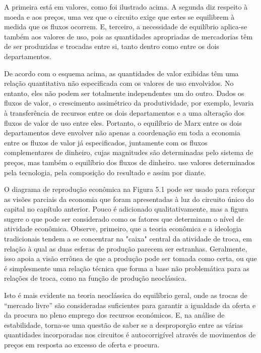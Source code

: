 A primeira está em valores, como foi ilustrado acima. A segunda diz respeito à moeda e aos preços, uma vez que o circuito exige que estes se equilibrem à medida que os fluxos ocorrem. E, terceiro, a necessidade de equilíbrio aplica-se também aos valores de uso, pois as quantidades apropriadas de mercadorias têm de ser produzidas e trocadas entre si, tanto dentro como entre os dois departamentos.
 \par 
De acordo com o esquema acima, as quantidades de valor exibidas têm uma relação quantitativa não especificada com os valores de uso envolvidos. No entanto, eles não podem ser totalmente independentes um do outro. Dados os fluxos de valor, o crescimento assimétrico da produtividade, por exemplo, levaria à transferência de recursos entre os dois departamentos e a uma alteração dos fluxos de valor de uso entre eles. Portanto, o equilíbrio de Marx entre os dois departamentos deve envolver não apenas a coordenação em toda a economia entre os fluxos de valor já especificados, juntamente com os fluxos complementares de dinheiro, cujas magnitudes são determinadas pelo sistema de preços, mas também o equilíbrio dos fluxos de dinheiro. use valores determinados pela tecnologia, pela composição do resultado e assim por diante.
 \par 
O diagrama de reprodução econômica na Figura {\color{blue}5}.1 pode ser usado para reforçar as visões parciais da economia que foram apresentadas à luz do circuito único do capital no capítulo anterior. Pouco é adicionado qualitativamente, mas a figura sugere o que pode ser considerado como os fatores que determinam o nível de atividade econômica. Observe, primeiro, que a teoria econômica e a ideologia tradicionais tendem a se concentrar na "caixa" central da atividade de troca, em relação à qual as duas esferas de produção parecem ser estranhas. Geralmente, isso apoia a visão errônea de que a produção pode ser tomada como certa, ou que é simplesmente uma relação técnica que forma a base não problemática para as relações de troca, como na função de produção neoclássica.
 \par 
Isto é mais evidente na teoria neoclássica do equilíbrio geral, onde as trocas de “mercado livre” são consideradas suficientes para garantir a igualdade da oferta e da procura no pleno emprego dos recursos económicos. E, na análise de estabilidade, torna-se uma questão de saber se a desproporção entre as várias quantidades incorporadas nos circuitos é autocorrigível através de movimentos de preços em resposta ao excesso de oferta e procura.
 \par 
